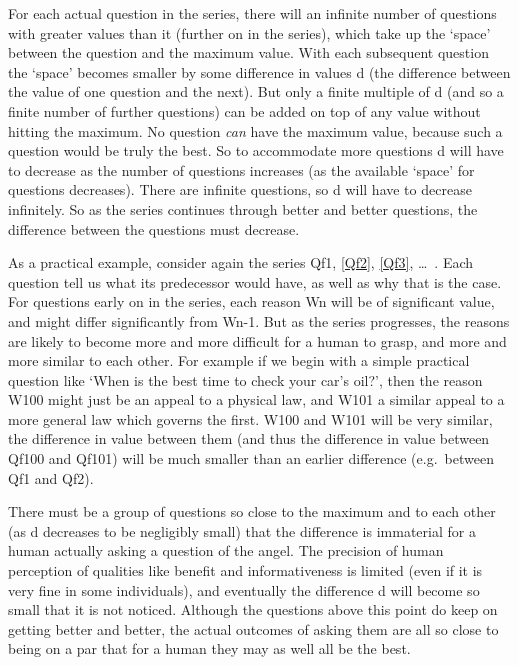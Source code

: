 For each actual question in the series, there will an infinite number of questions with greater values than it (further on in the series), which take up the `space' between the question and the maximum value.
With each subsequent question the `space' becomes smaller by some difference in values d (the difference between the value of one question and the next).
But only a finite multiple of d (and so a finite number of further questions) can be added on top of any value without hitting the maximum.
No question \emph{can} have the maximum value, because such a question would be truly the best.
So to accommodate more questions d will have to decrease as the number of questions increases (as the available `space' for questions decreases).
There are infinite questions, so d will have to decrease infinitely.
So as the series continues through better and better questions, the difference between the questions must decrease.

As a practical example, consider again the series Qf1, \ref{Qf2}, \ref{Qf3}, \ldots\ .
Each question tell us what its predecessor would have, as well as why that is the case.
For questions early on in the series, each reason Wn will be of significant value, and might differ significantly from Wn-1.
But as the series progresses, the reasons are likely to become more and more difficult for a human to grasp, and more and more similar to each other.
For example if we begin with a simple practical question like `When is the best time to check your car's oil?', then the reason W100 might just be an appeal to a physical law, and W101 a similar appeal to a more general law which governs the first.
W100 and W101 will be very similar, the difference in value between them (and thus the difference in value between Qf100 and Qf101) will be much smaller than an earlier difference (e.g.\ between Qf1 and Qf2).

There must be a group of questions so close to the maximum and to each other (as d decreases to be negligibly small) that the difference is immaterial for a human actually asking a question of the angel.
The precision of human perception of qualities like benefit and informativeness is limited (even if it is very fine in some individuals), and eventually the difference d will become so small that it is not noticed.
Although the questions above this point do keep on getting better and better, the actual outcomes of asking them are all so close to being on a par that for a human they may as well all be the best.


